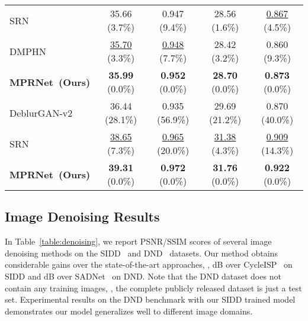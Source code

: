 \documentclass[10pt,twocolumn,letterpaper]{article}
\begin{document}
\begin{table}[t]
\begin{center}
{\begin{tabular}{l c | c || c |  c }
SRN~\cite{tao2018scale}              &  35.66 \colorbox{gray!20}{(3.7\%)}  &  0.947 \colorbox{gray!20}{(9.4\%)}    &  28.56  \colorbox{gray!20}{(1.6\%)} &  \underline{0.867} \colorbox{gray!20}{(4.5\%)} \\
DMPHN \cite{dmphn2019}               &  \underline{35.70} \colorbox{gray!20}{(3.3\%)} & \underline{0.948} \colorbox{gray!20}{(7.7\%)} & 28.42 \colorbox{gray!20}{(3.2\%)}  &  0.860 \colorbox{gray!20}{(9.3\%)} \\
\textbf{MPRNet~(Ours)}                        &  \textbf{35.99}	  \colorbox{gray!20}{(0.0\%)} & \textbf{0.952} \colorbox{gray!20}{(0.0\%)}    & \textbf{28.70} \colorbox{gray!20}{(0.0\%)} & \textbf{0.873} \colorbox{gray!20}{(0.0\%)} \\
\midrule
\midrule
\textcolor{red}{}\small{DeblurGAN-v2 \cite{deblurganv2}  }    &  36.44  \colorbox{gray!20}{(28.1\%)} &  0.935 \colorbox{gray!20}{(56.9\%)} &   29.69 \colorbox{gray!20}{(21.2\%)}  &  0.870 \colorbox{gray!20}{(40.0\%)}  \\
\textcolor{red}{}SRN  \cite{tao2018scale}             &  \underline{38.65} \colorbox{gray!20}{(7.3\%)}  &  \underline{0.965} \colorbox{gray!20}{(20.0\%)}   &   \underline{31.38} \colorbox{gray!20}{(4.3\%)}  &  \underline{0.909} \colorbox{gray!20}{(14.3\%)} \\
\textcolor{red}{}\textbf{MPRNet~(Ours)}  &	\textbf{39.31} \colorbox{gray!20}{(0.0\%)}	& \textbf{0.972} \colorbox{gray!20}{(0.0\%)} & \textbf{31.76} \colorbox{gray!20}{(0.0\%)} & \textbf{0.922} \colorbox{gray!20}{(0.0\%)} \\
\bottomrule[0.1em]
\end{tabular}}
\end{center}
\vspace{-1.6em}
\end{table}




\subsection{Image Denoising Results}
In Table~\ref{table:denoising}, we report PSNR/SSIM scores of several image denoising methods on the SIDD~\cite{sidd} and DND~\cite{dnd} datasets.
Our method obtains considerable gains over the state-of-the-art approaches, \ie,  dB over CycleISP~\cite{zamir2020cycleisp} on SIDD and  dB over SADNet~\cite{chang2020sadnet} on DND. 
Note that the DND dataset does not contain any training images, \ie, the complete publicly released dataset is just a test set. 
Experimental results on the DND benchmark with our SIDD trained model demonstrates our model generalizes well to different image domains. 
\end{document}
